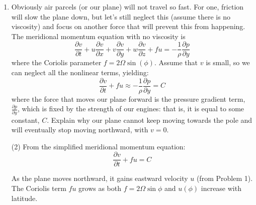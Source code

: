 \documentclass[letterpaper, 11pt]{article}
\newcommand{\1}{\mathds{1}}	%
\theoremstyle{definition}
\begin{document}
\begin{enumerate}
Using $\Omega = 7.292 \times 10^{-5}$ rad/s and $R_E = 6.371 \times 10^6$ m:
\[
\Omega R_E = 7.292 \times 10^{-5} \times 6.371 \times 10^6 \approx 464.5 \text{ m/s}
\]

\textbf{(b) Latitude where $u(\phi) = 343$ m/s (speed of sound):}

\[
343 = 464.5 \cdot \frac{\sin^2\phi}{\cos\phi}
\]
\[
\frac{\sin^2\phi}{\cos\phi} = \frac{343}{464.5} \approx 0.7384
\]

Let $c = \cos\phi$, so $\sin^2\phi = 1 - c^2$:
\[
\frac{1 - c^2}{c} = 0.7384
\]
\[
1 - c^2 = 0.7384c
\]
\[
c^2 + 0.7384c - 1 = 0
\]

Using the quadratic formula:
\[
c = \frac{-0.7384 + \sqrt{0.7384^2 + 4}}{2} = \frac{-0.7384 + \sqrt{4.5452}}{2} = \frac{-0.7384 + 2.132}{2} \approx 0.697
\]
\[
\phi = \cos^{-1}(0.697) \approx \boxed{45.8^\circ}
\]

\textbf{(c) Latitude where $u(\phi) = 3019$ m/s (Mach 9.6):}

\[
\frac{\sin^2\phi}{\cos\phi} = \frac{3019}{464.5} \approx 6.50
\]
\[
1 - c^2 = 6.50c
\]
\[
c^2 + 6.50c - 1 = 0
\]
\[
c = \frac{-6.50 + \sqrt{42.25 + 4}}{2} = \frac{-6.50 + 6.80}{2} \approx 0.150
\]
\[
\phi = \cos^{-1}(0.150) \approx \boxed{81.4^\circ}
\]

\item Obviously air parcels (or our plane) will not travel so fast. For one, friction will slow the plane down, but let's still neglect this (assume there is no viscosity) and focus on another force that will prevent this from happening. The meridional momentum equation with no viscosity is
\[
\frac{\partial v}{\partial t} + u\frac{\partial v}{\partial x} + v\frac{\partial v}{\partial y} + w\frac{\partial v}{\partial z} + fu = -\frac{1}{\rho}\frac{\partial p}{\partial y}
\]
where the Coriolis parameter $f = 2\Omega\sin(\phi)$. Assume that $v$ is small, so we can neglect all the nonlinear terms, yielding:
\[
\frac{\partial v}{\partial t} + fu \approx -\frac{1}{\rho}\frac{\partial p}{\partial y} = C
\]
where the force that moves our plane forward is the pressure gradient term, $\frac{\partial p}{\partial y}$, which is fixed by the strength of our engines: that is, it is equal to some constant, $C$. Explain why our plane cannot keep moving towards the pole and will eventually stop moving northward, with $v = 0$.

(2)
From the simplified meridional momentum equation:
\[
\frac{\partial v}{\partial t} + fu = C
\]

As the plane moves northward, it gains eastward velocity $u$ (from Problem 1). The Coriolis term $fu$ grows as both $f = 2\Omega\sin\phi$ and $u(\phi)$ increase with latitude.


\end{enumerate}
\end{document}
